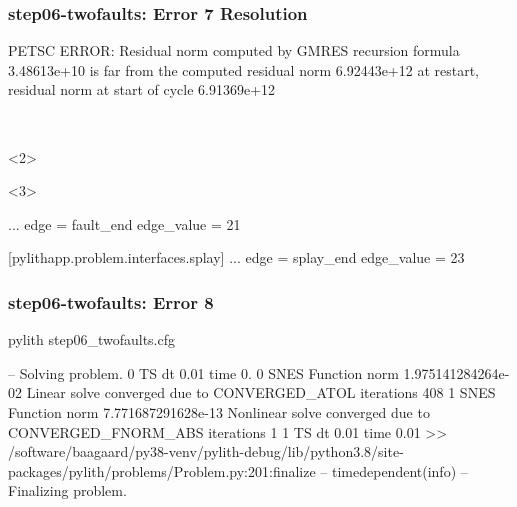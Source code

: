 \documentclass[aspectratio=169]{beamer}
\begin{document}
\begin{frame}[t,fragile]
  \frametitle{{\ttfamily step06-twofaults}: Error 7 Resolution}

  \tserror
  \begin{bashcode}
[0]PETSC ERROR: Residual norm computed by GMRES recursion formula 3.48613e+10 is far from the computed residual norm 6.92443e+12 at restart, residual norm at start of cycle 6.91369e+12
  \end{bashcode}

  \pause\\[1pt]

  \begin{onlyenv}<2>
  \end{onlyenv}
  \begin{onlyenv}<3>
  \begin{cfgcode}
      ...
      edge = fault_end
      edge_value = 21

      [pylithapp.problem.interfaces.splay]
      ...
      edge = splay_end
      edge_value = 23
  \end{cfgcode}
  \end{onlyenv}

\end{frame}


\begin{frame}[fragile]
  \frametitle{{\ttfamily step06-twofaults}: Error 8}

\begin{bashcode}
pylith step06_twofaults.cfg

 -- Solving problem.
0 TS dt 0.01 time 0.
    0 SNES Function norm 1.975141284264e-02 
    Linear solve converged due to CONVERGED_ATOL iterations 408
    1 SNES Function norm 7.771687291628e-13 
  Nonlinear solve converged due to CONVERGED_FNORM_ABS iterations 1
1 TS dt 0.01 time 0.01
 >> /software/baagaard/py38-venv/pylith-debug/lib/python3.8/site-packages/pylith/problems/Problem.py:201:finalize
 -- timedependent(info)
 -- Finalizing problem.
\end{bashcode}

\end{frame}
\end{document}
